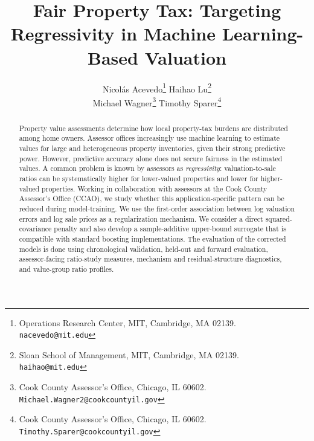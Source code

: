 \documentclass[10pt]{article}
\title{Fair Property Tax: Targeting Regressivity in Machine Learning-Based Valuation}
\author{
Nicol\'as Acevedo\thanks{Operations Research Center, MIT, Cambridge, MA 02139. \texttt{nacevedo@mit.edu}}
\qquad
Haihao Lu\thanks{Sloan School of Management, MIT, Cambridge, MA 02139. \texttt{haihao@mit.edu}}
\\[1ex]
Michael Wagner\thanks{Cook County Assessor's Office, Chicago, IL 60602. \texttt{Michael.Wagner2@cookcountyil.gov}}
\qquad
Timothy Sparer\thanks{Cook County Assessor's Office, Chicago, IL 60602. \texttt{Timothy.Sparer@cookcountyil.gov}}
}
\date{}
\theoremstyle{definition}
\newcommand{\1}{\mathbf{1}}
\begin{document}
\maketitle


\begin{abstract}

Property value assessments determine how local property-tax burdens are distributed among home owners.
Assessor offices increasingly use machine learning to
estimate values for large and heterogeneous property inventories, given their strong predictive power. However, predictive accuracy alone does not secure fairness in the estimated values. A common problem is known by assessors as \emph{regressivity}: valuation-to-sale ratios can be systematically higher for lower-valued properties and lower for higher-valued properties.
Working in collaboration with assessors at the Cook County Assessor's Office (CCAO), we study whether this application-specific pattern can be reduced during model-training. We use the first-order association between log valuation errors and log sale prices as a  regularization mechanism. We consider a direct squared-covariance penalty and also develop a sample-additive upper-bound surrogate that is compatible with standard boosting implementations. 
{The evaluation of the corrected models is done using chronological validation, held-out and forward evaluation, assessor-facing ratio-study measures, mechanism and residual-structure diagnostics, and value-group ratio profiles.} 

\end{abstract}
\end{document}
